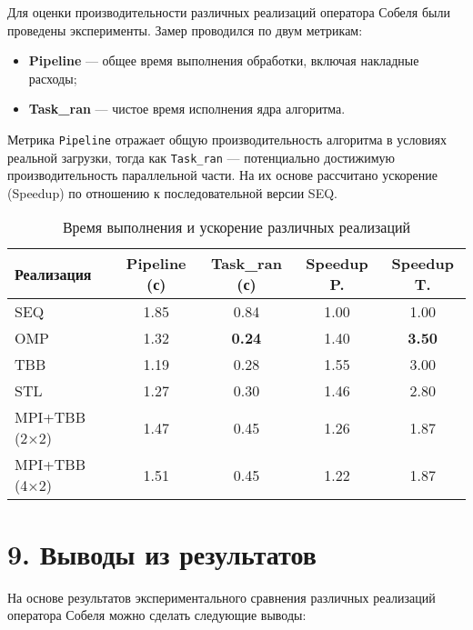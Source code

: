 \documentclass{report}
\begin{document}
Для оценки производительности различных реализаций оператора Собеля были проведены эксперименты. Замер проводился по двум метрикам:

\begin{itemize}
    \item \textbf{Pipeline} — общее время выполнения обработки, включая накладные расходы;
    \item \textbf{Task\_ran} — чистое время исполнения ядра алгоритма.
\end{itemize}

Метрика \texttt{Pipeline} отражает общую производительность алгоритма в условиях реальной загрузки, тогда как \texttt{Task\_ran} — потенциально достижимую производительность параллельной части. На их основе рассчитано ускорение (Speedup) по отношению к последовательной версии SEQ.

\begin{table}[h!]
\centering
\caption{Время выполнения и ускорение различных реализаций}
\begin{tabular}{|l|c|c|c|c|}
\hline
\textbf{Реализация} & \textbf{Pipeline (с)} & \textbf{Task\_ran (с)} & \textbf{Speedup P.} & \textbf{Speedup T.} \\
\hline
SEQ                 & 1.85 & 0.84 & 1.00 & 1.00 \\
OMP                 & 1.32 & \textbf{0.24} & 1.40 & \textbf{3.50} \\
TBB                 & 1.19 & 0.28 & 1.55 & 3.00 \\
STL                 & 1.27 & 0.30 & 1.46 & 2.80 \\
MPI+TBB (2×2)       & 1.47 & 0.45 & 1.26 & 1.87 \\
MPI+TBB (4×2)       & 1.51 & 0.45 & 1.22 & 1.87 \\
\hline
\end{tabular}
\end{table}





\section*{9. Выводы из результатов}
\justifying

На основе результатов экспериментального сравнения различных реализаций оператора Собеля можно сделать следующие выводы:
\end{document}
